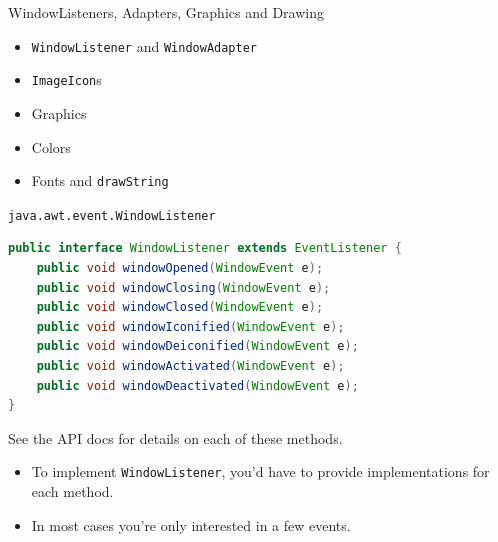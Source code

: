 \documentclass{beamer}
\author[Chris Simpkins] 
{Christopher Simpkins \\\texttt{chris.simpkins@gatech.edu}}
\institute[Georgia Tech] %
\date[CS 1331]{}
\begin{document}
\begin{frame}
  \titlepage
\end{frame}

\begin{frame}[fragile]{WindowListeners, Adapters, Graphics and Drawing}


\begin{itemize}
\item {\tt WindowListener} and {\tt WindowAdapter}
\item {\tt ImageIcon}s
\item Graphics
\item Colors
\item Fonts and {\tt drawString}
\end{itemize}


\end{frame}

\begin{frame}[fragile]{{\tt java.awt.event.WindowListener}}


\begin{lstlisting}[language=Java]
public interface WindowListener extends EventListener {
    public void windowOpened(WindowEvent e);
    public void windowClosing(WindowEvent e);
    public void windowClosed(WindowEvent e);
    public void windowIconified(WindowEvent e);
    public void windowDeiconified(WindowEvent e);
    public void windowActivated(WindowEvent e);
    public void windowDeactivated(WindowEvent e);
}
\end{lstlisting}
See the API docs for details on each of these methods.
\begin{itemize}
\item To implement {\tt WindowListener}, you'd have to provide implementations for each method.
\item In most cases you're only interested in a few events.
\end{itemize}


\end{frame}
\end{document}
